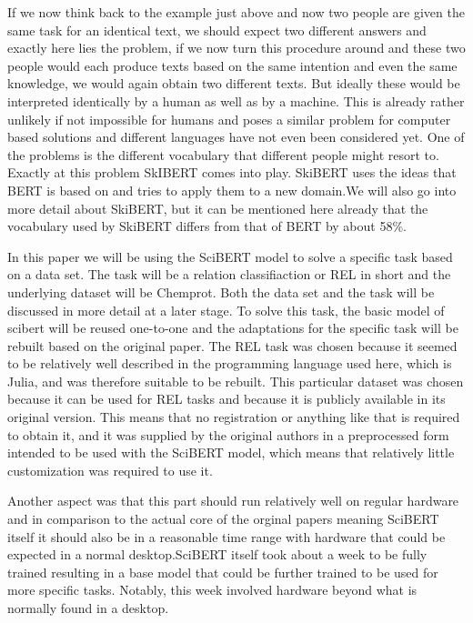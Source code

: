 If we now think back to the example just above and now two people are given the same task for an identical text, we should expect two different answers and exactly here lies the problem, if we now turn this procedure around and these two people would each produce texts based on the same intention and even the same knowledge, we would again obtain two different texts. But ideally these would be interpreted identically by a human as well as by a machine. This is already rather unlikely if not impossible for humans and poses a similar problem for computer based solutions and different languages have not even been considered yet. One of the problems is the different vocabulary that different people might resort to. Exactly at this problem SkIBERT comes into play. SkiBERT uses the ideas that BERT is based on and tries to apply them to a new domain.We will also go into more detail about SkiBERT, but it can be mentioned here already that the vocabulary used by SkiBERT differs from that of BERT by about 58\%. 

In this paper we will be using the SciBERT model to solve a specific task based on a data set. The task will be a relation classifiaction or REL in short and the underlying dataset will be Chemprot. Both the data set and the task will be discussed in more detail at a later stage. To solve this task, the basic model of scibert will be reused one-to-one and the adaptations for the specific task will be rebuilt based on the original paper. The REL task was chosen because it seemed to be relatively well described in the programming language used here, which is Julia, and was therefore suitable to be rebuilt. This particular dataset was chosen because it can be used for REL tasks and because it is publicly available in its original version. This means that no registration or anything like that is required to obtain it, and it was supplied by the original authors in a preprocessed form intended to be used with the SciBERT model, which means that relatively little customization was required to use it.

Another aspect was that this part should run relatively well on regular hardware and in comparison to the actual core of the orginal papers meaning SciBERT itself it should also be in a reasonable time range with hardware that could be expected in a normal desktop.SciBERT itself took about a week to be fully trained resulting in a base model that could be further trained to be used for more specific tasks. Notably, this week involved hardware beyond what is normally found in a desktop.   

